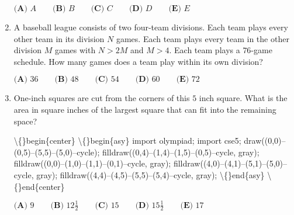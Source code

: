 \documentclass{article}
\begin{document}
\begin{enumerate}[label=\arabic*., itemsep=0.5em]
\(
\textbf{(A) } A \qquad
\textbf{(B) } B \qquad
\textbf{(C) } C \qquad
\textbf{(D) } D \qquad
\textbf{(E) } E
\)\par \vspace{0.5em}\item A baseball league consists of two four-team divisions. Each team plays every other team in its division \(N\) games. Each team plays every team in the other division \(M\) games with \(N>2M\) and \(M>4\). Each team plays a \(76\)-game schedule. How many games does a team play within its own division?

\(\textbf{(A) } 36 \qquad \textbf{(B) } 48 \qquad \textbf{(C) } 54 \qquad \textbf{(D) } 60 \qquad \textbf{(E) } 72\)\par \vspace{0.5em}\item One-inch squares are cut from the corners of this \(5\) inch square. What is the area in square inches of the largest square that can fit into the remaining space?


\textbackslash\{\}begin\{center\}
\textbackslash\{\}begin\{asy\}
import olympiad;
import cse5;
draw((0,0)--(0,5)--(5,5)--(5,0)--cycle);
filldraw((0,4)--(1,4)--(1,5)--(0,5)--cycle, gray);
filldraw((0,0)--(1,0)--(1,1)--(0,1)--cycle, gray);
filldraw((4,0)--(4,1)--(5,1)--(5,0)--cycle, gray);
filldraw((4,4)--(4,5)--(5,5)--(5,4)--cycle, gray);
\textbackslash\{\}end\{asy\}
\textbackslash\{\}end\{center\}


\( \textbf{(A) } 9\qquad \textbf{(B) } 12\frac{1}{2}\qquad \textbf{(C) } 15\qquad \textbf{(D) } 15\frac{1}{2}\qquad \textbf{(E) } 17\)\par \vspace{0.5em}\end{enumerate}
\end{document}
